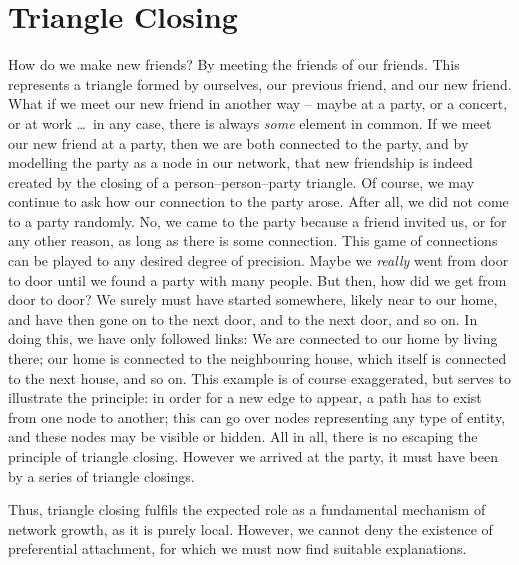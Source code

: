 \documentclass{jimis-final-en}
\begin{document}
\section{Triangle Closing}
How do we make new friends?  By meeting the friends of our friends.
This represents a triangle formed by ourselves, our previous friend, and our
new friend.  What if we meet our new friend in another way -- maybe at a
party, or a concert, or at work \ldots\ in any case, there is always
\emph{some} element in common. If we meet our new friend at a party, then
we are both connected to the party, and by modelling the party as a node
in our network, that new friendship is indeed created by the closing of
a person--person--party triangle.  Of course, we may continue to ask how
our connection to the party 
arose.  After all, we did not come to a party randomly.  No, we came to the party because a
friend invited us, or for any other reason, as long as there is some
connection.  This game of connections can be played to any
desired degree of precision.  Maybe we \emph{really} went from door to
door until we found a party with many people.  But then, how did we get
from door to door?  We surely must have started somewhere, likely near to our
home, and have then gone on to the next door, and to the next door, and
so on.  In doing this, we have only followed links:  We are connected to
our home by living there;  our home is connected to the neighbouring
house, which itself is connected to the next house, and so on. 
This example is of course exaggerated, but serves to illustrate the
principle:  in order for a new edge to appear, a path has to exist from
one node to another; this can go over nodes representing any type of
entity, and these nodes may be visible or hidden. 
All in 
all, there is no escaping the principle of triangle closing.  However we
arrived at the party, it must have been by a series of triangle
closings.  

Thus, triangle closing fulfils the expected role as a fundamental mechanism of
network growth, as it is purely local. 
However, we cannot deny the existence of preferential attachment, for which
we must now find suitable explanations. 
\end{document}
